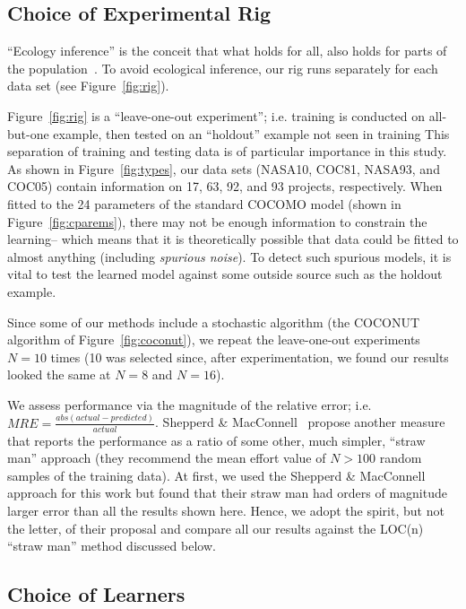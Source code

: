 \documentclass{sig-alternate}
\newcommand{\fig}[1]{Figure~\ref{fig:#1}}
\newenvironment{changed}{\par\color{MyDarkBlue}}{\par}
\begin{document}
\subsection{Choice of Experimental Rig}


``Ecology inference''
is the conceit 
that what holds for all, also holds for parts 
of the population~\cite{posnet11,me12d}.
To avoid ecological inference,
our  rig runs separately for each data set (see Figure~\ref{fig:rig}).

\begin{changed}
Figure~\ref{fig:rig} is a ``leave-one-out experiment''; i.e.
training is conducted on all-but-one example, then tested
on an ``holdout'' example not seen in training This separation of training and testing
data is of particular
importance in this study. 
As shown in \fig{types}, our  data sets (NASA10, COC81, NASA93, and COC05)
contain information on 17, 63, 92, and 93  projects, respectively. When fitted to
the   24 parameters of the standard COCOMO model  (shown in \fig{cparems}),
there may not be enough information to constrain the learning-- which means that it is theoretically
possible that data could be fitted to almost anything (including {\em spurious noise}).
To detect such spurious models, it is vital to test the learned model against some
outside source such as the holdout example.
\end{changed} 



Since some of our methods include a stochastic
algorithm (the COCONUT algorithm of \fig{coconut}),
we repeat the leave-one-out experiments $N=10$ times
(10 was selected since, after experimentation, we
found our results looked the same at $N=8$ and
$N=16$).

We assess  
performance via the magnitude of the relative error; i.e. 
\mbox{$ \mathit{MRE}=\frac{abs(\mathit{actual} - \mathit{predicted})}{\mathit{actual}}$}. 
Shepperd \& MacConnell~\cite{shepperd12a} propose
another measure that reports the performance as a
ratio of some other, much
simpler, ``straw man'' approach (they recommend the
mean effort value of $N>100$ random samples of the
training data). At first, we used the Shepperd \&
MacConnell approach for this work but found that
their straw man had orders of magnitude larger error
than all the results shown here. Hence, we adopt the
spirit, but not the letter, of their proposal and
compare all our results against the LOC(n) ``straw
man'' method discussed below.
 

\subsection{Choice of Learners}\label{sect:whatlearn}
\end{document}
